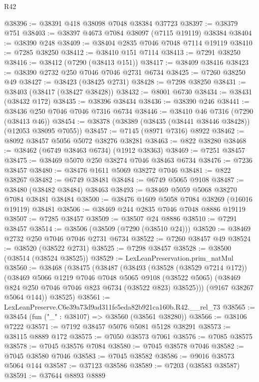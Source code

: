 \begin{lexlean}{R42}
\begin{coremodule}
{@38396 := @38391 @418 @38098 @7048 @38384 @37723
@38397 := @38379 @751
@38403 := @38397 @4673 @7084 @38097 (@7115 @19119) @38384
@38404 := @38390 @248
@38409 := @38404 @2835 @7046 @7048 @7114 @19119
@38410 := @7285 @38250
@38412 := @38410 @151 @7114
@38413 := @7291 @38250
@38416 := @38412 (@7290 (@38413 @151))
@38417 := @38409 @38416
@38423 := @38390 @2732 @250 @7046 @7046 @2731 @6734
@38425 := @7260 @38250 @49
@38427 := @38423 (@38425 @2731)
@38428 := @7298 @38250
@38431 := @38403 (@38417 (@38427 @38428))
@38432 := @8001 @6730
@38434 := @38431 (@38432 @172)
@38435 := @38396 @38434
@38436 := @38390 @246
@38441 := @38436 @250 @7046 @7046 @7316 @6734
@38446 := @38410 @46 @7316 (@7290 (@38413 @46))
@38454 := @38378 (@38389 (@38435 (@38441 @38446 @38428)) (@12053 @38095 @7055))
@38457 := @7145 (@8971 @7316) @8922
@38462 := @8092 @38457 @5056 @5072 @38276 @38281
@38463 := @822 @38280
@38468 := @38462 (@6749 @38463 @6734) (@1912 @38363)
@38469 := @7251 @38457
@38475 := @38469 @5070 @250 @38274 @7046 @38463 @6734
@38476 := @7236 @38457
@38480 := @38476 @1611 @5069 @38272 @7046
@38481 := @822 @38267
@38482 := @6749 @38481
@38484 := @6749 @5065 @9108
@38487 := @38480 (@38482 @38484) @38463
@38493 := @38469 @5059 @5068 @38270 @7084 @38481 @38484
@38500 := @38476 @1609 @5058 @7084 @38269 (@16016 @19119) @38481
@38506 := @38469 @244 @2835 @7046 @7048 @8886 @19119
@38507 := @7285 @38457
@38509 := @38507 @24 @8886
@38510 := @7291 @38457
@38514 := @38506 (@38509 (@7290 (@38510 @24)))
@38520 := @38469 @2732 @250 @7046 @7046 @2731 @6734
@38522 := @7260 @38457 @49
@38524 := @38520 (@38522 @2731)
@38525 := @7298 @38457
@38528 := @38500 (@38514 (@38524 @38525))
@38529 := LexLeanPreservation.prim_natMul
@38560 := @38468
    (@38475
      (@38487
        (@38493
          (@38528 (@38529 @7214 @172))
          (@38469
            @5066
            @1219
            @7046
            @7048
            @5065
            @9108
            (@38522 @5065)
            (@38469 @824 @250 @7046 @7046 @823 @6734 (@38522 @823) @38525)))
        (@9167 @38267 @5064 @144))
      @38525)
@38561 := LexLeanPreserve.C6e39a73d9ad311fe5eda82b921ca160b.R42.__rel_73
@38565 := @38454 (fun ("_" : @38107) => @38560 (@38561 @38280))
@38566 := @38106 @7222
@38571 := @7192 @38457 @5076 @5081 @5128 @38291
@38573 := @38115 @8889 @172
@38575 := @7050 @38573 @7061
@38576 := @7085 @38575
@38578 := @7045 @38576 @7084
@38580 := @7045 @38578 @7046
@38582 := @7045 @38580 @7046
@38583 := @7045 @38582
@38586 := @9016 @38573 @5064 @144
@38587 := @37123 @38586
@38589 := @7203 (@38583 @38587)
@38591 := @37644 @8893 @8889
}
\end{coremodule}
\end{lexlean}

